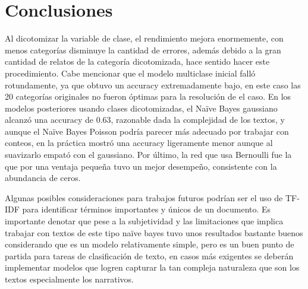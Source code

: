 \documentclass[eng]{ajceam-class}
\begin{document}
\section{Conclusiones}

Al dicotomizar la variable de clase, el rendimiento mejora enormemente, con menos categorías disminuye la cantidad de errores, además debido a la gran cantidad de relatos de la categoría dicotomizada, hace sentido hacer este procedimiento. Cabe mencionar que el modelo multiclase inicial falló rotundamente, ya que obtuvo un accuracy extremadamente bajo, en este caso las 20 categorías originales no fueron óptimas para la resolución de el caso. En los modelos posteriores usando clases dicotomizadas, el Naïve Bayes gaussiano alcanzó una accuracy de 0.63, razonable dada la complejidad de los textos, y aunque el Naïve Bayes Poisson podría parecer más adecuado por trabajar con conteos, en la práctica mostró una accuracy ligeramente menor aunque al suavizarlo empató con el gaussiano. Por último, la red que usa Bernoulli fue la que por una ventaja pequeña tuvo un mejor desempeño, consistente con la abundancia de ceros.

Algunas posibles consideraciones para trabajos futuros podrían ser el uso de TF-IDF para identificar términos importantes y únicos de un documento. Es importante denotar que pese a la subjetividad y las limitaciones que implica trabajar con textos de este tipo naïve bayes tuvo unos resultados bastante buenos considerando que es un modelo relativamente simple, pero es un buen punto de partida para tareas de clasificación de texto, en casos más exigentes se deberán implementar modelos que logren capturar la tan compleja naturaleza que son los textos especialmente los narrativos.

\end{document}
